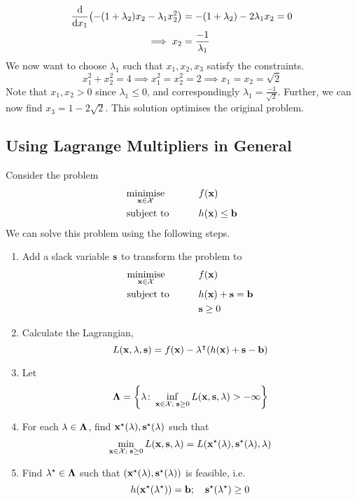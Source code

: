 \begin{example}
	\begin{align*}
		\dv{x_1} (-(1+\lambda_2) x_2 - \lambda_1 x_2^2) & = -(1+\lambda_2) - 2 \lambda_1 x_2 = 0 \\
		\implies x_2                                    & = \frac{-1}{\lambda_1}
	\end{align*}
	We now want to choose \(\lambda_1\) such that \(x_1, x_2, x_3\) satisfy the constraints.
	\[
		x_1^2 + x_2^2 = 4 \implies x_1^2 = x_2^2 = 2 \implies x_1 = x_2 = \sqrt{2}
	\]
	Note that \(x_1, x_2 > 0\) since \(\lambda_1 \leq 0\), and correspondingly \(\lambda_1 = \frac{-1}{\sqrt{2}}\).
	Further, we can now find \(x_3 = 1 - 2\sqrt{2}\).
	This solution optimises the original problem.
\end{example}

\subsection{Using Lagrange Multipliers in General}
Consider the problem
\begin{alignat*}{2}
	 & \underset{\vb x \in \mathcal X}{\text{minimise}} & \qquad & f(\vb x)            \\
	 & \text{subject to}                                &        & h(\vb x) \leq \vb b
\end{alignat*}
We can solve this problem using the following steps.
\begin{enumerate}[(1)]
	\item Add a slack variable \(\vb s\) to transform the problem to
	      \begin{alignat*}{2}
		       & \underset{\vb x \in \mathcal X}{\text{minimise}} & \qquad & f(\vb x)                 \\
		       & \text{subject to}                                &        & h(\vb x) + \vb s = \vb b \\
		       &                                                  &        & \vb s \geq 0
	      \end{alignat*}
	\item Calculate the Lagrangian,
	      \[
		      L(\vb x, \vb \lambda, \vb s) = f(\vb x) - \vb \lambda^\intercal (h(\vb x) + \vb s - \vb b)
	      \]
	\item Let
	      \[
		      \vb \Lambda = \qty{\vb \lambda \colon \inf_{\vb x \in \mathcal X;\; \vb s \geq 0} L(\vb x, \vb s, \vb \lambda) > -\infty}
	      \]
	\item For each \(\vb\lambda \in \vb\Lambda\), find \(\vb x^\star(\vb \lambda), \vb s^\star(\vb \lambda)\) such that
	      \[
		      \min_{\vb x \in \mathcal X;\; \vb s \geq 0} L(\vb x, \vb s, \vb \lambda) = L(\vb x^\star(\vb \lambda), \vb s^\star(\vb \lambda), \vb \lambda)
	      \]
	\item Find \(\vb\lambda^\star \in \vb\Lambda\) such that \((\vb x^\star(\vb \lambda), \vb s^\star(\vb \lambda))\) is feasible, i.e.
	      \[
		      h(\vb x^\star(\vb \lambda^\star)) = \vb b;\quad \vb s^\star (\vb \lambda^\star) \geq 0
	      \]
\end{enumerate}

